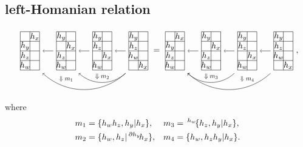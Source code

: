 \documentclass[11pt, reqno]{amsart} %
\newcommand{\act}[1]{\,\sp{#1}\!}
\newcommand{\strsquare}[4][]{
  \begin{scope}[every node/.append style={overlay},#1]
    \foreach \x [count=\i] in {#4}{
      \ifx\x\empty
      \else
        \pgfmathsetmacro{\modResult}{mod(\i-1, #2)}
        \pgfmathsetmacro{\quotResult}{(\i-\modResult-1)/#2}
        \node at (\modResult,-\quotResult) {\x};
      \fi
    }
    \foreach \x in {0,1,...,#2}{
      \draw ({-1/2+\x},{1/2})--({-1/2+\x},{-#3+1/2});
    }
    \foreach \y in {0,1,...,#3}{
      \draw ({-1/2},{1/2-\y})--({#2-1/2},{1/2-\y});
    }
  \end{scope}
}
\theoremstyle{definition}
\theoremstyle{remark}
\numberwithin{equation}{section}
\begin{document}
\subsection{left-Homanian relation}
\[
  \begin{tikzpicture}[baseline=-2pt]
    \node (A) at (2.25,0) {\tikz[baseline=-2pt,scale=.4]{\strsquare{2}{4}{$h_y$,,$h_z$,,$h_w$,,,$h_x$}}};
    \node (B) at (.75,0) {\tikz[baseline=-2pt,scale=.4]{\strsquare{2}{4}{$h_y$,,$h_z$,,,$h_x$,$h_w$,}}};
    \node (C) at (-.75,0) {\tikz[baseline=-2pt,scale=.4]{\strsquare{2}{4}{$h_y$,,,$h_x$,$h_z$,,$h_w$,}}};
    \node (D) at (-2.25,0) {\tikz[baseline=-2pt,scale=.4]{\strsquare{2}{4}{,$h_x$,$h_y$,,$h_z$,,$h_w$,}}};
    \draw [->] (A) to (B);
    \draw [->] (B) to (C);
    \draw [->] (C) to (D);
    \draw [->,bend left=1.5cm] (A.south west) to (D.south east);
    \draw [->,bend left=1.5cm] (A.south west) to node (D) {} (C.south east);
    \path (B.north) to [pos=15/16] coordinate (A) (B.south);
    \path (B) to node [transform shape,scale=.75] {$\Downarrow m_2$} (D);
    \path (C.north) to [pos=5/4] coordinate (D) (C.south);
    \path (C) to node [transform shape,scale=.75] {$\Downarrow m_1$} (D);
  \end{tikzpicture}
  =
  \begin{tikzpicture}[baseline=-2pt]
    \node (A) at (2.25,0) {\tikz[baseline=-2pt,scale=.4]{\strsquare{2}{4}{$h_y$,,$h_z$,,$h_w$,,,$h_x$}}};
    \node (B) at (.75,0) {\tikz[baseline=-2pt,scale=.4]{\strsquare{2}{4}{$h_y$,,$h_z$,,,$h_x$,$h_w$,}}};
    \node (C) at (-.75,0) {\tikz[baseline=-2pt,scale=.4]{\strsquare{2}{4}{$h_y$,,,$h_x$,$h_z$,,$h_w$,}}};
    \node (D) at (-2.25,0) {\tikz[baseline=-2pt,scale=.4]{\strsquare{2}{4}{,$h_x$,$h_y$,,$h_z$,,$h_w$,}}};
    \draw [->] (A) to (B);
    \draw [->] (B) to (C);
    \draw [->] (C) to (D);
    \draw [->,bend left=1.5cm] (A.south west) to (D.south east);
    \draw [->,bend left=1.5cm] (B.south west) to node (A) {} (D.south east);
    \path (C) to node [transform shape,scale=.75] {$\Downarrow m_3$} (A);
    \path (B.north) to [pos=5/4] coordinate (D) (B.south);
    \path (B) to node [transform shape,scale=.75] {$\Downarrow m_4$} (D);
  \end{tikzpicture},
\]
where
\begin{align}
  \nonumber
  m_1 &= \{h_wh_z,h_y|h_x\}, &
  m_3 &= \act{h_w}\{h_z,h_y|h_x\}, \\
  \nonumber
  m_2 &= \{h_w,h_z|\act{\partial h_y}h_x\}, &
  m_4 &= \{h_w,h_zh_y|h_x\}.
\end{align}
\end{document}
